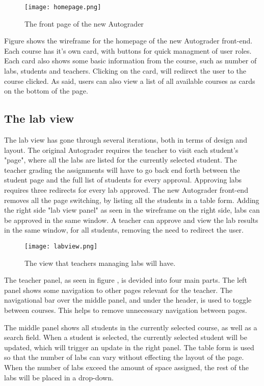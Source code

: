 \begin{figure}[h!]
	 \centering
   \texttt{[image: homepage.png]}
   \caption{The front page of the new Autograder}
   \label{fig:Wireframes for the new Autograder front-end}
\end{figure}

Figure  shows the wireframe for the homepage of the new Autograder front-end. Each course has it's own card, with buttons for quick managment of user roles. Each card also shows some basic information from the course, such as number of labs, students and teachers. Clicking on the card, will redirect the user to the course clicked. As said, users can also view a list of all available courses as cards on the bottom of the page.

\subsection{The lab view}
The lab view has gone through several iterations, both in terms of design and layout. The original Autograder requires the teacher to visit each student's "page", where all the labs are listed for the currently selected student. The teacher grading the assignments will have to go back end forth between the student page and the full list of students for every approval. Approving labs requires three redirects for every lab approved. The new Autograder front-end removes all the page switching, by listing all the students in a table form. Adding the right side "lab view panel" as seen in the wireframe on the right side, labs can be approved in the same window. A teacher can approve and view the lab results in the same window, for all students, removing the need to redirect the user.

\begin{figure}[h!]
	 \centering
   \texttt{[image: labview.png]}
   \caption{The view that teachers managing labs will have.}
   \label{fig:Wireframes for the new Autograder front-end}
\end{figure}

The teacher panel, as seen in figure , is devided into four main parts. The left panel shows some navigation to other pages relevant for the teacher. The navigational bar over the middle panel, and under the header, is used to toggle between courses. This helps to remove unnecessary navigation between pages.

The middle panel shows all students in the currently selected course, as well as a search field. When a student is selected, the currently selected student will be updated, which will trigger an update in the right panel. The table form is used so that the number of labs can vary without effecting the layout of the page. When the number of labs exceed the amount of space assigned, the rest of the labs will be placed in a drop-down.

